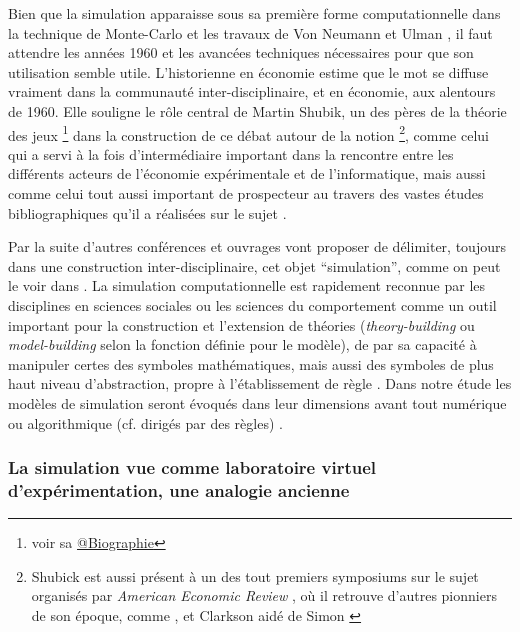 Bien que la simulation apparaisse sous sa première forme computationnelle dans la technique de Monte-Carlo et les travaux de Von Neumann et Ulman \autocite{Eckhardt1987}, il faut attendre les années 1960 et les avancées techniques nécessaires pour que son utilisation semble utile. L'historienne en économie \textcite{Morgan2004} estime que le mot se diffuse vraiment dans la communauté inter-disciplinaire, et en économie, aux alentours de 1960. Elle souligne le rôle central de Martin Shubik, un des pères de la théorie des jeux \footnote{voir sa \href{http://blogs.library.duke.edu/rubenstein/2012/12/18/the-martin-shubik-papers-from-early-game-theory-to-the-strategic-analysis-of-war/}{@Biographie}} dans la construction de ce débat autour de la notion \footnote{Shubick est aussi présent à un des tout premiers symposiums sur le sujet organisés par \textit{American Economic Review} \autocite{Shubik1960b}, où il retrouve d'autres pionniers de son époque, comme \textcite{Orcutt1960}, et Clarkson aidé de Simon \autocite{Clarkson1960}}, comme celui qui a servi à la fois d'intermédiaire important dans la rencontre entre les différents acteurs de l'économie expérimentale et de l'informatique, mais aussi comme celui tout aussi important de prospecteur au travers des vastes études bibliographiques qu'il a réalisées sur le sujet \autocite{Shubik1960a, Shubik1972} \autocite{Morgan2004}.

Par la suite d'autres conférences et ouvrages vont proposer de délimiter, toujours dans une construction inter-disciplinaire, cet objet \enquote{simulation}, comme on peut le voir dans \autocite{Guetzkow1962, Borko1962, Guetzkow1972, Dutton1971}. La simulation computationnelle est rapidement reconnue par les disciplines en sciences sociales ou les sciences du comportement comme un outil important pour la construction et l'extension de théories (\textit{theory-building} ou \textit{model-building} selon la fonction définie pour le modèle), de par sa capacité à manipuler certes des symboles mathématiques, mais aussi des symboles de plus haut niveau d'abstraction, propre à l'établissement de règle \autocite[924-925]{Clarkson1960}. Dans notre étude les modèles de simulation seront évoqués dans leur dimensions avant tout numérique ou algorithmique (cf. dirigés par des règles) \autocite[36-38]{Varenne2013}.

\subsubsection{La simulation vue comme laboratoire virtuel d'expérimentation, une analogie ancienne}
\label{ssec:labo_virtuelle}


